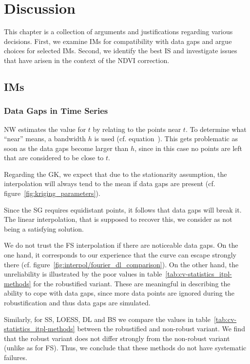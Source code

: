 \chapter{Discussion}\label{sec:discussion}
    This chapter is a collection of arguments and justifications regarding various decisions. First, we examine IMs for compatibility with data gaps and argue choices for selected IMs. Second, we identify the best IS and investigate issues that have arisen in the context of the NDVI correction.


\section{{{IM}}s}{ \label{sec:discussion_itpl}
    \subsection{Data Gaps in Time Series}\label{sec:discussion_itpl_data_gaps}{
        NW estimates the value for $t$ by relating to the points near $t$. To determine what ``near'' means, a bandwidth $h$ is used (cf. equation~). This gets problematic as soon as the data gaps become larger than $h$, since in this case no points are left that are considered to be close to $t$. 

        Regarding the GK, we expect that due to the stationarity assumption, the interpolation will always tend to the mean if data gaps are present (cf. figure~\ref{fig:kriging_parameters}). 

        Since the SG requires equidistant points, it follows that data gaps will break it. The linear interpolation, that is supposed to recover this, we consider as not being a satisfying solution.

        We do not trust the FS interpolation if there are noticeable data gaps. On the one hand, it corresponds to our experience that the curve can escape strongly there (cf. figure~\ref{fig:interpol/fourier_dl_comparison}). On the other hand, the unreliability is illustrated by the poor values in table~\ref{tab:cv-statistics_itpl-methods} for the robustified variant. These are meaningful in describing the ability to cope with data gaps, since more data points are ignored during the robustification and thus data gaps are simulated. 

        Similarly, for SS, LOESS, DL and BS we compare the values in table~\ref{tab:cv-statistics_itpl-methods} between the robustified and non-robust variant. We find that the robust variant does not differ strongly from the non-robust variant (unlike as for FS). Thus, we conclude that these methods do not have systematic failures.

}}
